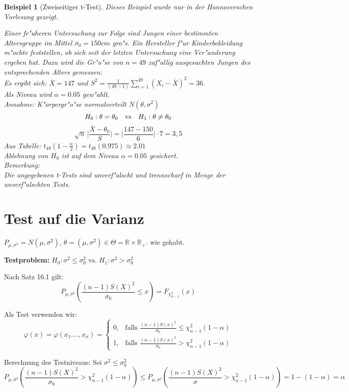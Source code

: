 \documentclass[a4paper,11pt]{book}
\newcommand{\R}{{\mathbb R}}
\newtheorem{Bsp}{Beispiel}[chapter]
\theoremstyle{nonumberplain}
\begin{document}
\begin{Bsp}[Zweiseitiger t-Test]
\emph{Dieses Beispiel wurde nur in der Hannoverschen Vorlesung gezeigt.}

Einer fr"uheren Untersuchung zur Folge sind Jungen einer bestimmten Altersgruppe im Mittel $\sigma_0=150cm$ gro"s. Ein Hersteller f"ur Kinderbekleidung m"ochte feststellen, ob sich seit der letzten Untersuchung eine Ver"anderung ergeben hat. Dazu wird die Gr"o"se von $n=49$ zuf"allig ausgesuchten Jungen des entsprechenden Alters gemessen:\\
Es ergibt sich: $\overline{X}=147$ und $S^2=\frac{1}{(49-1)}\sum_{i=1}^{49} (X_i-\overline{X})^2=36$.\\
Als Niveau wird $\alpha=0.05$ gew"ahlt.\\
Annahme: K"orpergr"o"se normalverteilt $N(\theta,\sigma^2)$
\[H_0: \theta = \theta_0 \quad \textnormal{vs}\quad H_1: \theta \neq \theta_0\]
\[\sqrt{n}\,\bigr|\frac{\overline{X}-\theta_0}{S}\bigr|=\bigr|\frac{147-150}{6}\bigr|\cdot 7= 3,5\]
Aus Tabelle: $t_{48}(1-\frac{\alpha}{2})=t_{48}(0.975)\approx 2.01$\\
Ablehnung von $H_0$ ist auf dem Niveau $\alpha=0.05$ gesichert.\\
Bemerkung:\\
Die angegebenen t-Tests sind unverf"alscht und trennscharf in Menge der unverf"alschten Tests. 
\end{Bsp}

\section{Test auf die Varianz}
$P_{\mu,\sigma^2} = N(\mu,\sigma^2)$, $\theta=(\mu,\sigma^2)\in \Theta = \R\times\R_+$. wie gehabt.

\textbf{Testproblem:} $H_0: \sigma^2\leq \sigma_0^2\text{ vs. }H_1:  \sigma^2>\sigma_0^2$

Nach Satz 16.1 gilt:
\[P_{\mu,\sigma^2}(\frac{(n-1)S(X)^2}{\sigma_0}\le x) = F_{\chi^2_{n-1}}(x)\]

Als Test verwenden wir:
\[\varphi(x)=\varphi(x_1.\ldots,x_n)=
\begin{cases}
0, & \text{falls }\frac{(n-1)S(x)^2}{\sigma_0}\le \chi_{n-1}^2(1-\alpha)  \\
1, & \text{falls }\frac{(n-1)S(x)^2}{\sigma_0}> \chi_{n-1}^2(1-\alpha) 
\end{cases}\]

Berechnung des Testniveaus: Sei $\sigma^2\leq \sigma_0^2$
\[P_{\mu,\sigma^2}\left(\frac{(n-1)S(X)^2}{\sigma_0}> \chi_{n-1}^2(1-\alpha)\right)\leq P_{\mu,\sigma^2}\left(\frac{(n-1)S(X)^2}{\sigma}> \chi_{n-1}^2(1-\alpha)\right)=1-(1-\alpha)=\alpha\]
\end{document}

